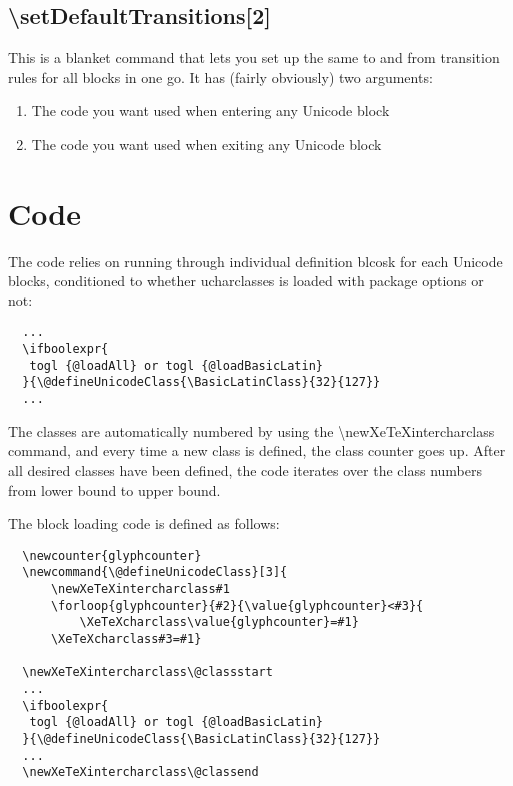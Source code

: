 ﻿\documentclass{article}
\newenvironment{numberlist}{%
  \begin{enumerate}
	\setlength{\itemsep}{0pt}
	\setlength{\parsep}{0pt}
	\setlength{\topsep}{0pt}
	\setlength{\partopsep}{0pt}
	\setlength{\parskip}{0pt}
	\setlength{\labelsep}{5pt}}%
{
  \end{enumerate}}
\begin{document}
		\subsection{\textbackslash setDefaultTransitions[2]}
		
			This is a blanket command that lets you set up the same to and from transition rules for all blocks in one go. It has (fairly obviously) two arguments:
			
			\begin{numberlist}
				\item The code you want used when entering any Unicode block
				\item The code you want used when exiting any Unicode block
			\end{numberlist}

	\section{Code}
	
		The code relies on running through individual definition blcosk for each Unicode blocks, conditioned to whether ucharclasses is loaded with package options or not:
		
		\pagebreak
		
		\disableTransitionRules
		\begin{verbatim}
  ...
  \ifboolexpr{
   togl {@loadAll} or togl {@loadBasicLatin}
  }{\@defineUnicodeClass{\BasicLatinClass}{32}{127}}
  ...
		\end{verbatim}
		\enableTransitionRules
		
		The classes are automatically numbered by using the \textbackslash newXeTeXintercharclass command, and every time a new class is defined, the class counter goes up. After all desired classes have been defined, the code iterates over the class numbers from lower bound to upper bound.
		
		The block loading code is defined as follows:
		
		\disableTransitionRules
		\begin{verbatim}
  \newcounter{glyphcounter}
  \newcommand{\@defineUnicodeClass}[3]{
      \newXeTeXintercharclass#1
      \forloop{glyphcounter}{#2}{\value{glyphcounter}<#3}{
          \XeTeXcharclass\value{glyphcounter}=#1}
      \XeTeXcharclass#3=#1}

  \newXeTeXintercharclass\@classstart
  ...
  \ifboolexpr{
   togl {@loadAll} or togl {@loadBasicLatin}
  }{\@defineUnicodeClass{\BasicLatinClass}{32}{127}}
  ...
  \newXeTeXintercharclass\@classend
		\end{verbatim}
		\enableTransitionRules
\end{document}
